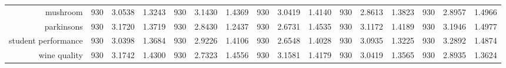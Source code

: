 \begin{table}[htbp]
{\begin{tabular}{rccccccccccccccc}
			mushroom                            & 930                                 & 3.0538                                                                    & 1.3243          & 930                            & 3.1430                                                                             & 1.4369          & 930                             & 3.0419                                                                    & 1.4140          & 930                             & \cellcolor[rgb]{ .776,  .937,  .808}\textcolor[rgb]{ 0,  .38,  0}{2.8613} & 1.3823          & 930                             & 2.8957          & 1.4966          \\
			parkinsons                          & 930                                 & 3.1720                                                                    & 1.3719          & 930                            & 2.8430                                                                             & 1.2437          & 930                             & \cellcolor[rgb]{ .776,  .937,  .808}\textcolor[rgb]{ 0,  .38,  0}{2.6731} & 1.4535          & 930                             & 3.1172                                                                    & 1.4189          & 930                             & 3.1946          & 1.4977          \\
			student performance                 & 930                                 & 3.0398                                                                    & 1.3684          & 930                            & 2.9226                                                                             & 1.4106          & 930                             & \cellcolor[rgb]{ .776,  .937,  .808}\textcolor[rgb]{ 0,  .38,  0}{2.6548} & 1.4028          & 930                             & 3.0935                                                                    & 1.3225          & 930                             & 3.2892          & 1.4874          \\
			wine quality                        & 930                                 & 3.1742                                                                    & 1.4300          & 930                            & \cellcolor[rgb]{ .776,  .937,  .808}\textcolor[rgb]{ 0,  .38,  0}{2.7323}          & 1.4556          & 930                             & 3.1581                                                                    & 1.4179          & 930                             & 3.0419                                                                    & 1.3565          & 930                             & 2.8935          & 1.3624          \\

\end{tabular}}
\end{table}
